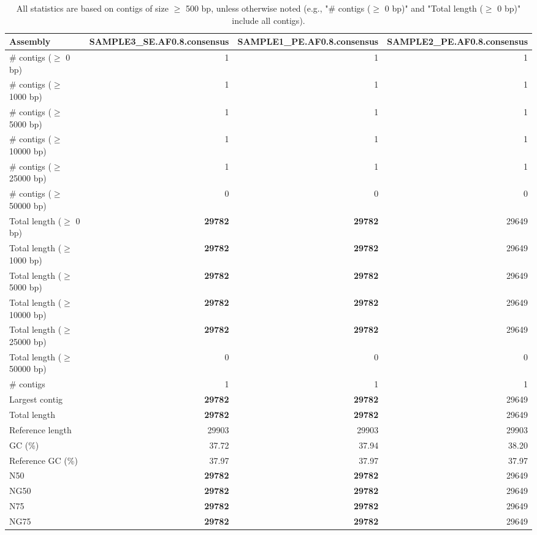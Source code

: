 \documentclass[12pt,a4paper]{article}
\begin{document}
\begin{table}[ht]
\begin{center}
\caption{All statistics are based on contigs of size $\geq$ 500 bp, unless otherwise noted (e.g., "\# contigs ($\geq$ 0 bp)" and "Total length ($\geq$ 0 bp)" include all contigs).}
\begin{tabular}{|l*{3}{|r}|}
\hline
Assembly & SAMPLE3\_SE.AF0.8.consensus & SAMPLE1\_PE.AF0.8.consensus & SAMPLE2\_PE.AF0.8.consensus \\ \hline
\# contigs ($\geq$ 0 bp) & 1 & 1 & 1 \\ \hline
\# contigs ($\geq$ 1000 bp) & 1 & 1 & 1 \\ \hline
\# contigs ($\geq$ 5000 bp) & 1 & 1 & 1 \\ \hline
\# contigs ($\geq$ 10000 bp) & 1 & 1 & 1 \\ \hline
\# contigs ($\geq$ 25000 bp) & 1 & 1 & 1 \\ \hline
\# contigs ($\geq$ 50000 bp) & 0 & 0 & 0 \\ \hline
Total length ($\geq$ 0 bp) & {\bf 29782} & {\bf 29782} & 29649 \\ \hline
Total length ($\geq$ 1000 bp) & {\bf 29782} & {\bf 29782} & 29649 \\ \hline
Total length ($\geq$ 5000 bp) & {\bf 29782} & {\bf 29782} & 29649 \\ \hline
Total length ($\geq$ 10000 bp) & {\bf 29782} & {\bf 29782} & 29649 \\ \hline
Total length ($\geq$ 25000 bp) & {\bf 29782} & {\bf 29782} & 29649 \\ \hline
Total length ($\geq$ 50000 bp) & 0 & 0 & 0 \\ \hline
\# contigs & 1 & 1 & 1 \\ \hline
Largest contig & {\bf 29782} & {\bf 29782} & 29649 \\ \hline
Total length & {\bf 29782} & {\bf 29782} & 29649 \\ \hline
Reference length & 29903 & 29903 & 29903 \\ \hline
GC (\%) & 37.72 & 37.94 & 38.20 \\ \hline
Reference GC (\%) & 37.97 & 37.97 & 37.97 \\ \hline
N50 & {\bf 29782} & {\bf 29782} & 29649 \\ \hline
NG50 & {\bf 29782} & {\bf 29782} & 29649 \\ \hline
N75 & {\bf 29782} & {\bf 29782} & 29649 \\ \hline
NG75 & {\bf 29782} & {\bf 29782} & 29649 \\ \hline

\end{tabular}
\end{center}
\end{table}
\end{document}
